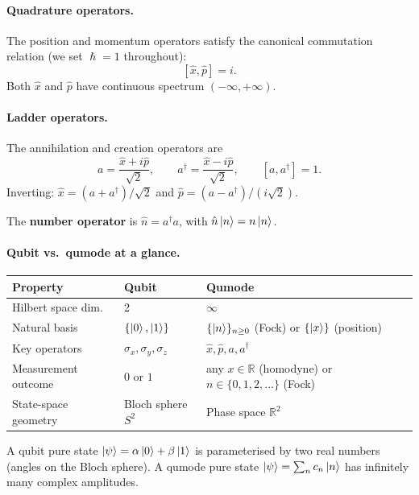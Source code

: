 \documentclass[11pt]{article}
\newcommand{\hbar}{\hslash}
\newcommand{\CR}{\mathbb{R}}
\newcommand{\xh}{\hat{x}}
\newcommand{\ph}{\hat{p}}
\newcommand{\nh}{\hat{n}}
\newcommand{\ad}{a^{\dagger}}
\begin{document}
\paragraph{Quadrature operators.}
The position and momentum operators satisfy the canonical commutation
relation (we set $\hbar = 1$ throughout):
\begin{equation}\label{eq:ccr}
[\xh, \ph] = i.
\end{equation}
Both $\xh$ and $\ph$ have continuous spectrum $(-\infty, +\infty)$.

\paragraph{Ladder operators.}
The annihilation and creation operators are
\begin{equation}\label{eq:ladder}
a = \frac{\xh + i\ph}{\sqrt{2}}, \qquad
\ad = \frac{\xh - i\ph}{\sqrt{2}}, \qquad
[a, \ad] = 1.
\end{equation}
Inverting: $\xh = (a + \ad)/\sqrt{2}$ and $\ph = (a - \ad)/(i\sqrt{2})$.

The \textbf{number operator} is $\nh = \ad a$, with $\nh\ket{n} = n\ket{n}$.

\paragraph{Qubit vs.\ qumode at a glance.}

\begin{center}
\begin{tabular}{lll}
\toprule
Property & Qubit & Qumode \\
\midrule
Hilbert space dim.\ & 2 & $\infty$ \\
Natural basis & $\{\ket{0}, \ket{1}\}$ & $\{\ket{n}\}_{n \geq 0}$ (Fock) or $\{\ket{x}\}$ (position) \\
Key operators & $\sigma_x, \sigma_y, \sigma_z$ & $\xh, \ph, a, \ad$ \\
Measurement outcome & $0$ or $1$ & any $x \in \CR$ (homodyne) or $n \in \{0,1,2,\ldots\}$ (Fock) \\
State-space geometry & Bloch sphere $S^2$ & Phase space $\CR^2$ \\
\bottomrule
\end{tabular}
\end{center}

A qubit pure state $\ket{\psi} = \alpha\ket{0} + \beta\ket{1}$ is
parameterised by two real numbers (angles on the Bloch sphere).
A qumode pure state $\ket{\psi} = \sum_n c_n \ket{n}$ has infinitely many
complex amplitudes.
\end{document}
